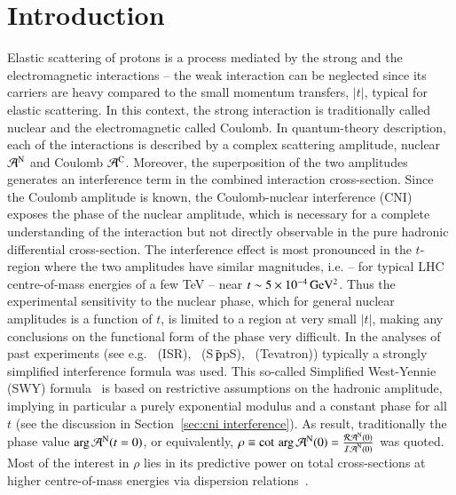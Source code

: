 \section{Introduction}
\label{sec:introduction}

Elastic scattering of protons is a process mediated by the strong and the electromagnetic interactions -- the weak interaction can be neglected since its carriers are heavy compared to the small momentum transfers, $|t|$, typical for elastic scattering. In this context, the strong interaction is traditionally called nuclear and the electromagnetic called Coulomb. In quantum-theory description, each of the interactions is described by a complex scattering amplitude, nuclear ${\cal A}^{\rm N}$ and Coulomb ${\cal A}^{\rm C}$. Moreover, the superposition 
of the two amplitudes generates an interference term in the combined interaction cross-section. 
Since the Coulomb amplitude is known, the Coulomb-nuclear interference (CNI) exposes the phase of the nuclear amplitude, which is necessary for a complete understanding of the interaction but not directly observable in the pure hadronic differential cross-section. The interference effect is most pronounced in the $t$-region where the two amplitudes have similar magnitudes, i.e. -- for typical LHC centre-of-mass energies of a few TeV -- near $t \sim 5 \times 10^{-4}\,\rm GeV^{2}$. Thus the experimental sensitivity to 
the nuclear phase, which for general nuclear amplitudes is a function of $t$, 
is limited to a region at very small $|t|$, making any conclusions on the 
functional form of the phase very difficult.
In the analyses of past experiments (see e.g.~\cite{plb43,plb66,npb141,prl47,plb115,plb120,plb128,npb262} 
(ISR),~\cite{plb198,plb316} (S$\bar{\,{\rm p}}$pS),~\cite{prl68} (Tevatron)) 
typically a strongly simplified interference formula was used. This so-called
Simplified West-Yennie (SWY) formula~\cite{wy68} is based on restrictive assumptions on the 
hadronic amplitude, implying in particular a purely exponential modulus and a 
constant phase for all $t$ (see the discussion in 
Section~\ref{sec:cni interference}).
As result, traditionally the phase value $\arg {\cal A}^{\rm N} (t=0)$, or
equivalently, $\rho \equiv \cot \, \arg {\cal A}^{\rm N} (0) = \frac{{\cal R A}^{\rm N} (0)}{{\cal I A}^{\rm N} (0)}$ was quoted. 
Most of the interest in $\rho$ lies in its predictive power on total cross-sections at higher centre-of-mass energies via dispersion 
relations~\cite{dremin-dispersion}. 

